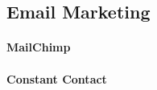 \subsection{Email Marketing}
\label{subsec:3.1.3:EmaiMarkt}


\paragraph{MailChimp}

\paragraph{Constant Contact}



\begin{comment}
--> At the end, put the all the comparison tables together to the Appendix
--> These features are also helped us to add them into our app, decided by saying they all support so we can also support
\end{comment}
